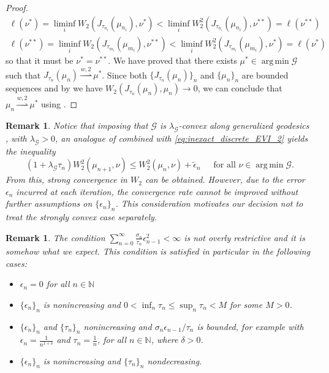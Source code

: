 \documentclass[11pt]{article}
\DeclareMathOperator*{\argmin}{arg\,min}
\newtheorem{remark}[theorem]{Remark}
\newcommand{\cG}{\mathcal{G}}
\newcommand{\N}{\mathbb{N}}
\newcommand{\wsto}{\overset{w,2}{\rightharpoonup}}
\numberwithin{equation}{section}
\begin{document}
\begin{proof}
	\begin{equation*}
		\begin{aligned}
			\ell(\nu^*) = \liminf_i W_2(J_{\tau_{n_i}}(\mu_{n_i}),\nu^*) < \liminf_i W_2^2(J_{\tau_{n_i}}(\mu_{n_i}),\nu^{**})=\ell(\nu^{**})\\
			\ell(\nu^{**}) = \liminf_i W_2(J_{\tau_{m_i}}(\mu_{m_i}),\nu^{**}) < \liminf_i W_2^2(J_{\tau_{m_i}}(\mu_{m_i}),\nu^{*})=\ell(\nu^{*})
		\end{aligned}
	\end{equation*}
	so that it must be $\nu^*=\nu^{**}$. We have proved that there exists $\mu^*\in \argmin \cG$ such that $J_{\tau_n}(\mu_n)\wsto \mu^*$. Since both $\{J_{\tau_n}(\mu_n)\}_n$ and $\{\mu_n\}_n$ are bounded sequences and by  we have $W_2(J_{\tau_n}(\mu_n),\mu_n)\to 0$, we can conclude that $\mu_n\wsto \mu^*$ using .
\end{proof}

\begin{remark}\label{rem:strongly-convex} Notice that imposing that $\cG$ is $\lambda_{\cG}$-convex along generalized geodesics \cite[Definition 9.2.4]{AGS08}, with $\lambda_{\cG} >0$, an analogue of \cite[Theorem 4.1.2 (ii)]{AGS08} combined with \eqref{eq:inexact_discrete_EVI_2} yields the inequality \[(1+\lambda_{\cG} \tau_n) W_2^2(\mu_{n+1},\nu)\leq W_2^2(\mu_n,\nu) + \tilde{\epsilon}_n\, \quad \text{ for all } \nu \in \argmin \cG.\] From this, strong convergence  in $W_2$ can be obtained. However, due to the error $\epsilon_n$ incurred at each iteration, the convergence rate cannot be improved without further assumptions on $\{\epsilon_n\}_n$. This consideration motivates our decision not to treat the strongly convex case separately.
\end{remark}


\begin{remark}
	The condition $\sum_{n=0}^{\infty}\frac{\sigma_n}{\tau_n}\epsilon_{n-1}^2  < \infty$ is not overly restrictive and it is somehow what we expect. This condition is satisfied in particular in the following cases:
	\begin{itemize}
		\item $\epsilon_n=0$ for all $n\in \mathbb{N}$
		\item $\{\epsilon_n\}_n$ is nonincreasing and $0 < \inf_n \tau_n \leq \sup_n \tau_n < M$ for some $M>0$.
		\item $\{\epsilon_n\}_n$ and $\{\tau_n\}_n$ nonincreasing and $\sigma_n\epsilon_{n-1}/\tau_n$ is bounded, for example with $\epsilon_n=\frac{1}{n^{1+\delta}}$ and $\tau_n= \frac{1}{n}$, for all $n\in \N$, where $\delta > 0$.
		\item $\{\epsilon_n\}_n$ is nonincreasing and $\{\tau_n\}_n$ nondecreasing.
	\end{itemize}
\end{remark}
\end{document}

